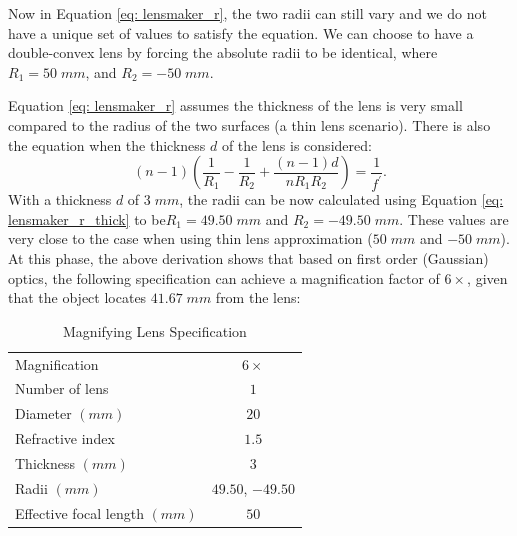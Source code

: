 Now in Equation \ref{eq: lensmaker_r}, the two radii can still vary and we do not have a unique set of values to satisfy the equation. We can choose to have a double-convex lens by forcing the absolute radii to be identical, where $R_1 = 50 \; mm$, and $R_2 = -50 \; mm$. 

Equation \ref{eq: lensmaker_r} assumes the thickness of the lens is very small compared to the radius of the two surfaces (a thin lens scenario). There is also the equation when the thickness $d$ of the lens is considered:
\begin{equation} \label{eq: lensmaker_r_thick}
    (n-1)\left( \frac{1}{R_1} - \frac{1}{R_2} + \frac{(n-1)d}{nR_1R_2} \right) = \frac{1}{f^\prime}  .
\end{equation}
With a thickness $d$ of $3 \; mm$, the radii can be now calculated using Equation \ref{eq: lensmaker_r_thick} to be$R_1 =  49.50 \; mm$ and $R_2 = -49.50 \; mm$. These values are very close to the case when using thin lens approximation ($50 \; mm$ and $-50 \; mm$). 
At this phase, the above derivation shows that based on first order (Gaussian) optics, the following specification can achieve a magnification factor of $6\times$, given that the object locates $41.67 \; mm$ from the lens:

\begin{table}[h!]
    \centering
    \captionsetup{justification=centering}
    \caption{Magnifying Lens Specification}
    \label{magnifying lens specs}
    \vspace{-1em}
    \begin{tabular}{ p{15em}  c }
    \hline 
    Magnification & $6\times$\\ 
    Number of lens & $1$\\ 
    Diameter $(mm)$ & $20$ \\ 
    Refractive index & $1.5$\\ 
    Thickness $(mm)$& $3$\\ 
    Radii $(mm)$ & $49.50$, $-49.50$\\
    Effective focal length $(mm)$ & $50$\\
    \hline
    \end{tabular}
\end{table}
 
